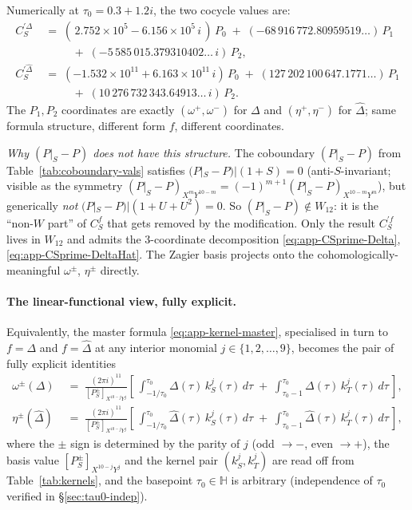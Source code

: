 \documentclass[11pt,letterpaper]{article}
\newcommand{\HH}{\mathbb{H}}
\begin{document}
Numerically at $\tau_0 = 0.3 + 1.2 i$, the two cocycle values are:
\begin{align}
  C^{\prime \Delta}_S
   &\;=\; (\,2.752\!\times\!10^{5} - 6.156\!\times\!10^{5}\,i\,)\,P_0
        \;+\; (-68\,916\,772.80959519\ldots)\,P_1 \nonumber\\
   &\phantom{\;=\;}\;\;
        \;+\; (-5\,585\,015.379310402\ldots\,i)\,P_2,
   \label{eq:app-CSprime-Delta} \\[4pt]
  C^{\prime \widehat\Delta}_S
   &\;=\; (-1.532\!\times\!10^{11} + 6.163\!\times\!10^{11}\,i)\,P_0
        \;+\; (127\,202\,100\,647.1771\ldots)\,P_1 \nonumber\\
   &\phantom{\;=\;}\;\;
        \;+\; (10\,276\,732\,343.64913\ldots\,i)\,P_2.
   \label{eq:app-CSprime-DeltaHat}
\end{align}
The $P_1, P_2$ coordinates are exactly $(\omega^+, \omega^-)$ for $\Delta$
and $(\eta^+, \eta^-)$ for $\widehat\Delta$; same formula structure, different
form $f$, different coordinates.

\emph{Why $(P|_S - P)$ does not have this structure.}
The coboundary $(P|_S - P)$ from Table~\ref{tab:coboundary-vals} satisfies
$(P|_S - P)|(1+S) = 0$ (anti-$S$-invariant; visible as the symmetry
$(P|_S-P)_{X^m Y^{10-m}} = (-1)^{m+1}(P|_S-P)_{X^{10-m}Y^m}$), but generically
\emph{not} $(P|_S - P)|(1+U+U^2) = 0$.  So $(P|_S - P) \notin W_{12}$:
it is the ``non-$W$ part'' of $C^f_S$ that gets removed by the modification.
Only the result $C^{\prime f}_S$ lives in $W_{12}$ and admits the
$3$-coordinate decomposition \eqref{eq:app-CSprime-Delta},
\eqref{eq:app-CSprime-DeltaHat}.  The Zagier basis projects onto the
cohomologically-meaningful $\omega^\pm$, $\eta^\pm$ directly.

\paragraph{The linear-functional view, fully explicit.}
Equivalently, the master formula \eqref{eq:app-kernel-master}, specialised
in turn to $f = \Delta$ and $f = \widehat\Delta$ at any interior monomial
$j \in \{1, 2, \ldots, 9\}$, becomes the pair of fully explicit identities
\begin{align}
  \omega^\pm(\Delta)
   &\;=\; \frac{(2\pi i)^{11}}{[P^\pm_S]_{X^{10-j}Y^j}}
          \left[\,\int_{-1/\tau_0}^{\tau_0}\!\Delta(\tau)\,k_S^j(\tau)\,d\tau
              \;+\; \int_{\tau_0-1}^{\tau_0}\!\Delta(\tau)\,k_T^j(\tau)\,d\tau\,\right],
   \label{eq:app-omega-Delta} \\[6pt]
  \eta^\pm(\widehat\Delta)
   &\;=\; \frac{(2\pi i)^{11}}{[P^\pm_S]_{X^{10-j}Y^j}}
          \left[\,\int_{-1/\tau_0}^{\tau_0}\!\widehat\Delta(\tau)\,k_S^j(\tau)\,d\tau
              \;+\; \int_{\tau_0-1}^{\tau_0}\!\widehat\Delta(\tau)\,k_T^j(\tau)\,d\tau\,\right],
   \label{eq:app-eta-DeltaHat}
\end{align}
where the $\pm$ sign is determined by the parity of $j$ (odd $\to -$,
even $\to +$), the basis value $[P^\pm_S]_{X^{10-j}Y^j}$ and the kernel
pair $(k_S^j, k_T^j)$ are read off from Table~\ref{tab:kernels}, and the
basepoint $\tau_0 \in \HH$ is arbitrary (independence of $\tau_0$
verified in \S\ref{sec:tau0-indep}).
\end{document}
